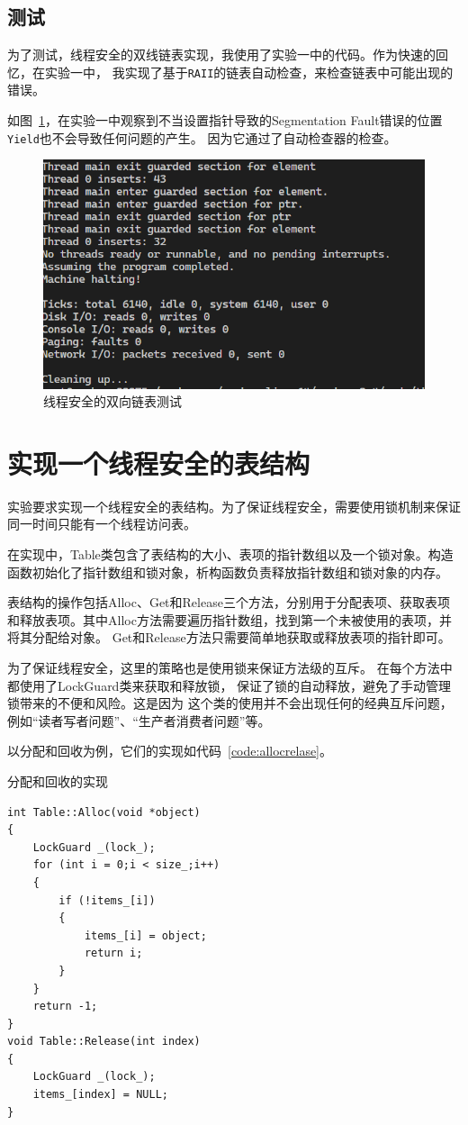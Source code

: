 \documentclass[a4paper,twoside]{article}
\begin{document}
\begin{spacing}{1.2}
\subsection{测试}

为了测试，线程安全的双线链表实现，我使用了实验一中的代码。作为快速的回忆，在实验一中，
我实现了基于\texttt{RAII}的链表自动检查，来检查链表中可能出现的错误。

如图~\ref{fig:threads}，在实验一中观察到不当设置指针导致的Segmentation Fault错误的位置\texttt{Yield}也不会导致任何问题的产生。
因为它通过了自动检查器的检查。

\begin{figure}[htb]
	\centering
	\caption{线程安全的双向链表测试}
	\label{fig:threads}
	\includegraphics[width=0.6\linewidth]{thread.png}
\end{figure}

\newpage

\section{实现一个线程安全的表结构}

实验要求实现一个线程安全的表结构。为了保证线程安全，需要使用锁机制来保证同一时间只能有一个线程访问表。

在实现中，Table类包含了表结构的大小、表项的指针数组以及一个锁对象。构造函数初始化了指针数组和锁对象，析构函数负责释放指针数组和锁对象的内存。

表结构的操作包括Alloc、Get和Release三个方法，分别用于分配表项、获取表项和释放表项。其中Alloc方法需要遍历指针数组，找到第一个未被使用的表项，并将其分配给对象。
Get和Release方法只需要简单地获取或释放表项的指针即可。

为了保证线程安全，这里的策略也是使用锁来保证方法级的互斥。
在每个方法中都使用了LockGuard类来获取和释放锁，
保证了锁的自动释放，避免了手动管理锁带来的不便和风险。这是因为
这个类的使用并不会出现任何的经典互斥问题，例如“读者写者问题”、“生产者消费者问题”等。

以分配和回收为例，它们的实现如代码~\ref{code:allocrelase}。
\begin{listing}[htb]
	\caption{分配和回收的实现}
	\label{code:allocrelase}
	\begin{verbatim}
int Table::Alloc(void *object)
{
    LockGuard _(lock_);
    for (int i = 0;i < size_;i++)
    {
        if (!items_[i])
        {
            items_[i] = object;
            return i;
        }
    }
    return -1;
}
void Table::Release(int index)
{
    LockGuard _(lock_);
    items_[index] = NULL;
}
	\end{verbatim}
\end{listing}


\end{spacing}
\end{document}
